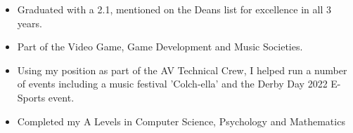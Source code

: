 \documentclass[10pt,a4paper,ragged2e,withhyper]{altacv}
\begin{document}

%
%
%
%
%
%
%
%


\begin{itemize}
	\item Graduated with a 2.1, mentioned on the Deans list for excellence in all 3 years.
	\item Part of the Video Game, Game Development and Music Societies.
	\item Using my position as part of the AV Technical Crew, I helped run a number of events including a music festival 'Colch-ella' and the Derby Day 2022 E-Sports event.
\end{itemize}


\divider


\begin{itemize}
	\item Completed my A Levels in Computer Science, Psychology and Mathematics
\end{itemize}




\end{document}
